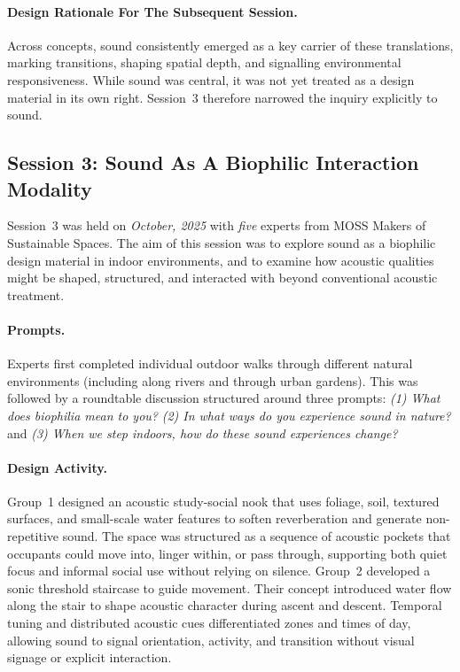 \paragraph{Design Rationale For The Subsequent Session.} 
Across concepts, sound consistently emerged as a key carrier of these translations, marking transitions, shaping spatial depth, and signalling environmental responsiveness. While sound was central, it was not yet treated as a design material in its own right. Session~3 therefore narrowed the inquiry explicitly to sound.

\subsection{Session 3: Sound As A Biophilic Interaction Modality}
\label{subsec:ch5-session3}
Session~3 was held on \textit{October, 2025} with \textit{five} experts from MOSS Makers of Sustainable Spaces. The aim of this session was to explore sound as a biophilic design material in indoor environments, and to examine how acoustic qualities might be shaped, structured, and interacted with beyond conventional acoustic treatment. 

\paragraph{Prompts.}
Experts first completed individual outdoor walks through different natural environments (including along rivers and through urban gardens). This was followed by a roundtable discussion structured around three prompts: \emph{(1) What does biophilia mean to you?} \emph{(2) In what ways do you experience sound in nature?} and \emph{(3) When we step indoors, how do these sound experiences change?}

\paragraph{Design Activity.}
Group~1 designed an acoustic study-social nook that uses foliage, soil, textured surfaces, and small-scale water features to soften reverberation and generate non-repetitive sound. The space was structured as a sequence of acoustic pockets that occupants could move into, linger within, or pass through, supporting both quiet focus and informal social use without relying on silence. Group~2 developed a sonic threshold staircase to guide movement. Their concept introduced water flow along the stair to shape acoustic character during ascent and descent. Temporal tuning and distributed acoustic cues differentiated zones and times of day, allowing sound to signal orientation, activity, and transition without visual signage or explicit interaction.


